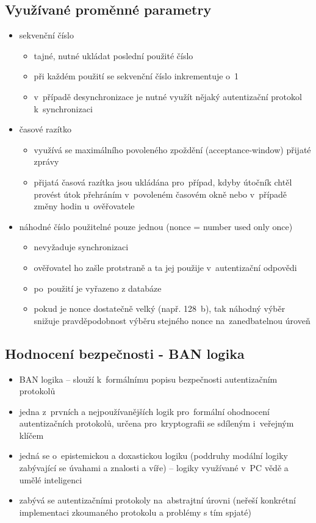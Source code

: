 \subsection{Využívané proměnné parametry}
\begin{itemize}
    \item sekvenční číslo
    \begin{itemize}
        \item tajné, nutné ukládat poslední použité číslo
        \item při každém použití se sekvenční číslo inkrementuje o~1
        \item v~případě desynchronizace je nutné využít nějaký autentizační protokol k~synchronizaci
    \end{itemize}
    \item časové razítko
    \begin{itemize}
        \item využívá se maximálního povoleného zpoždění (acceptance-window) přijaté zprávy
        \item přijatá časová razítka jsou ukládána pro~případ, kdyby útočník chtěl provést útok přehráním v~povoleném časovém okně nebo v~případě změny hodin u~ověřovatele
    \end{itemize}
    \item náhodné číslo použitelné pouze jednou (nonce = number used only once)
    \begin{itemize}
        \item nevyžaduje synchronizaci
        \item ověřovatel ho zašle protstraně a ta jej použije v~autentizační odpovědi
        \item po~použití je vyřazeno z databáze
        \item pokud je nonce dostatečně velký (např. 128~b), tak náhodný výběr snižuje pravděpodobnost výběru stejného nonce na~zanedbatelnou úroveň
    \end{itemize}
\end{itemize}

\subsection{Hodnocení bezpečnosti - BAN logika}
\begin{itemize}
    \item BAN logika -- slouží k~formálnímu popisu bezpečnosti autentizačním protokolů
    \item jedna z~prvních a nejpoužívanějších logik pro~formální ohodnocení autentizačních protokolů, určena pro~kryptografii se sdíleným i~veřejným klíčem
    \item jedná se o~epistemickou a doxastickou logiku (poddruhy modální logiky zabývající se úvahami a znalosti a víře) -- logiky využívané v~PC vědě a umělé inteligenci
    \item zabývá se autentizačními protokoly na~abstrajtní úrovni (neřeší konkrétní implementaci zkoumaného protokolu a problémy s tím spjaté)
\end{itemize}

